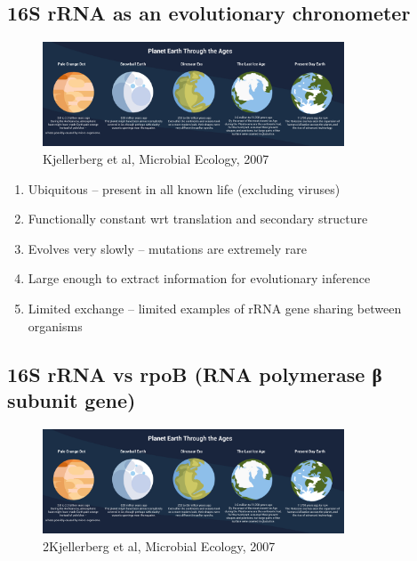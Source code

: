 \documentclass[
]{book}
\providecommand{\tightlist}{%
  \setlength{\itemsep}{0pt}\setlength{\parskip}{0pt}}
\begin{document}
\hypertarget{s-rrna-as-an-evolutionary-chronometer}{%
\subsection{16S rRNA as an evolutionary chronometer}\label{s-rrna-as-an-evolutionary-chronometer}}

\begin{figure}
\centering
\includegraphics[width=0.8\textwidth,height=\textheight]{./Figures/Planets.png}
\caption{Kjellerberg et al, Microbial Ecology, 2007}
\end{figure}

\begin{enumerate}
\def\labelenumi{\arabic{enumi}.}
\tightlist
\item
  Ubiquitous -- present in all known life (excluding viruses)
\item
  Functionally constant wrt translation and secondary structure
\item
  Evolves very slowly -- mutations are extremely rare
\item
  Large enough to extract information for evolutionary inference
\item
  Limited exchange -- limited examples of rRNA gene sharing between organisms
\end{enumerate}

\hypertarget{s-rrna-vs-rpob-rna-polymerase-ux3b2-subunit-gene}{%
\subsection{16S rRNA vs rpoB (RNA polymerase β subunit gene)}\label{s-rrna-vs-rpob-rna-polymerase-ux3b2-subunit-gene}}

\begin{figure}
\centering
\includegraphics[width=0.8\textwidth,height=\textheight]{./Figures/Planets.png}
\caption{2Kjellerberg et al, Microbial Ecology, 2007}
\end{figure}
\end{document}
